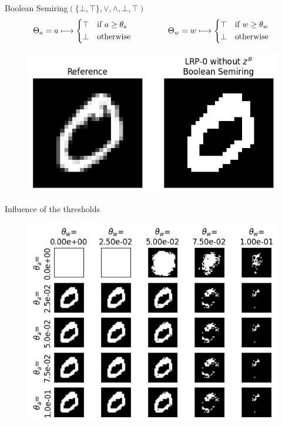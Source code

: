 \documentclass[aspectratio=169]{beamer}
\theoremstyle{definition}
\begin{document}
\begin{frame}{Boolean Semiring}{\large $(\{\bot, \top\}, \lor, \land, \bot, \top)$}
    \begin{equation*}
        \Theta_a = a \longmapsto \begin{cases*}
            \top & if $a\geq\theta_a$\\
            \bot & otherwise
        \end{cases*}
        \qquad\qquad
        \Theta_w = w \longmapsto \begin{cases*}
            \top & if $w\geq\theta_w$\\
            \bot & otherwise
        \end{cases*}
    \end{equation*}

    \begin{figure}[H]
        \centering
        \includegraphics[width=.5\textwidth]{boolean.png}
    \end{figure}
\end{frame}

\begin{frame}{Influence of the thresholds}
    \begin{figure}
        \centering
        \includegraphics[width=.6\textwidth]{boolean-threshold.png}
    \end{figure}
\end{frame}
\end{document}
